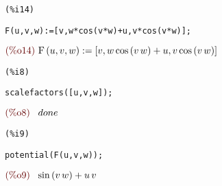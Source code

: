 \documentclass[12pt]{article}
\begin{document}
\noindent
\begin{minipage}[t]{8ex}{\color{red}\bf
\begin{verbatim}
(%i14) 
\end{verbatim}}
\end{minipage}
\begin{minipage}[t]{\textwidth}{\color{blue}
\begin{verbatim}
F(u,v,w):=[v,w*cos(v*w)+u,v*cos(v*w)];
\end{verbatim}}
\end{minipage}
\begin{math}\displaystyle
\parbox{8ex}{\color{labelcolor}(\%o14) }
\mathrm{F}\left( u,v,w\right) :=[v,w\,\mathrm{cos}\left( v\,w\right) +u,v\,\mathrm{cos}\left( v\,w\right) ]
\end{math}


\noindent
\begin{minipage}[t]{8ex}{\color{red}\bf
\begin{verbatim}
(%i8) 
\end{verbatim}}
\end{minipage}
\begin{minipage}[t]{\textwidth}{\color{blue}
\begin{verbatim}
scalefactors([u,v,w]);
\end{verbatim}}
\end{minipage}
\begin{math}\displaystyle
\parbox{8ex}{\color{labelcolor}(\%o8) }
done
\end{math}


\noindent
\begin{minipage}[t]{8ex}{\color{red}\bf
\begin{verbatim}
(%i9) 
\end{verbatim}}
\end{minipage}
\begin{minipage}[t]{\textwidth}{\color{blue}
\begin{verbatim}
potential(F(u,v,w));
\end{verbatim}}
\end{minipage}
\begin{math}\displaystyle
\parbox{8ex}{\color{labelcolor}(\%o9) }
\mathrm{sin}\left( v\,w\right) +u\,v
\end{math}
\end{document}
